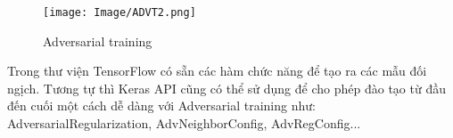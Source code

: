 \begin{figure}[h!]
    \centering
    \texttt{[image: Image/ADVT2.png]}
    \caption{Adversarial training}
    \label{Hình 1.6: Adversarial training}
    \cite*{Reference8}
\end{figure}

Trong thư viện TensorFlow có sẵn các hàm chức năng để tạo ra các mẫu đối ngịch. 
Tương tự thì Keras API cũng có thể sử dụng để cho phép đào tạo từ đầu đến cuối
một cách dễ dàng với Adversarial training như: AdversarialRegularization, AdvNeighborConfig, AdvRegConfig...